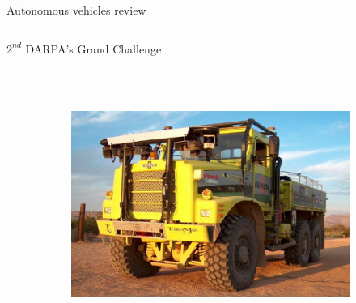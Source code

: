 \begin{frame}{Autonomous vehicles review}
\begin{columns}[T]
\begin{center}
\begin{overlayarea}{\textwidth}{\textheight}
{\begin{block}{$2^{nd}$ DARPA's Grand Challenge}
\begin{figure}[t]
\begin{subfigure}[b]{0.4\textwidth}
		    \end{subfigure}
		    \\~\\
		    \begin{subfigure}[b]{0.4\textwidth}
		      \includegraphics[width=\textwidth]{terramax}
		    \end{subfigure}
	    \end{figure}
	  \end{block}
	  }
\end{overlayarea}
\end{center}
\end{columns}
\end{frame}
